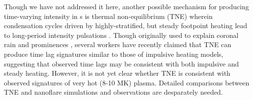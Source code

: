 Though we have not addressed it here, another possible mechanism for producing time-varying intensity in \AR s is thermal non-equilibrium (TNE) wherein condensation cycles driven by highly-stratified, but steady footpoint heating lead to long-period intensity pulsations \citep{kuin_thermal_1982}. Though originally used to explain coronal rain \citep{antolin_coronal_2010,antolin_multithermal_2015,auchere_coronal_2018} and prominences \citep{antiochos_model_1991}, several workers \citep{mok_three-dimensional_2016,winebarger_investigation_2016,froment_long-period_2017,winebarger_identifying_2018,froment_occurrence_2018} have recently claimed that TNE can produce time lag signatures similar to those of impulsive heating models, suggesting that observed time lags may be consistent with both impulsive and steady heating. However, it is not yet clear whether TNE is consistent with observed signatures of very hot (8-10 MK) plasma. Detailed comparisons between TNE and nanoflare simulations and observations are desparately needed.
